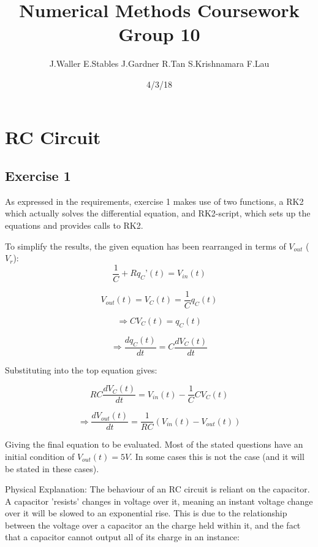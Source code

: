 \documentclass[11pt, oneside, titlepage]{article}   	%
\title{Numerical Methods Coursework \\ \large{Group 10}\\}
\author{J.Waller E.Stables J.Gardner R.Tan S.Krishnamara F.Lau}
\date{4/3/18}							%
\begin{document}
\maketitle

\section{RC Circuit}
\subsection{Exercise 1}
As expressed in the requirements, exercise 1 makes use of two functions, a RK2 which actually solves the differential equation, and RK2-script, which sets up the equations and provides calls to RK2. 

To simplify the results, the given equation has been rearranged in terms of $V_{out}$ ($V_r$):
\begin{equation}
\frac{1}{C}+Rq_C\text{'}(t)=V_{in}(t)
\end{equation}

\begin{equation}
V_{out}(t)=V_C(t)=\frac{1}{C}q_C(t)
\end{equation}

\begin{equation}
\Rightarrow CV_C(t)=q_C(t)
\end{equation}

\begin{equation}
\Rightarrow \frac{dq_C(t)}{dt}=C\frac{dV_C(t)}{dt
}\end{equation}

Substituting into the top equation gives:

\begin{equation}
RC\frac{dV_C(t)}{dt}=V_{in}(t)-\frac{1}{C}CV_C(t)
\end{equation}

\begin{equation}
\Rightarrow \frac{dV_{out}(t)}{dt}=\frac{1}{RC}(V_{in}(t)-V_{out}(t))
\end{equation}

Giving the final equation to be evaluated. Most of the stated questions have an initial condition of $V_{out}(t)=5V$. In some cases this is not the case (and it will be stated in these cases).

Physical Explanation: The behaviour of an RC circuit is reliant on the capacitor. A capacitor 'resists' changes in voltage over it, meaning an instant voltage change over it will be slowed to an exponential rise. This is due to the relationship between the voltage over a capacitor an the charge held within it, and the fact that a capacitor cannot output all of its charge in an instance:
\end{document}
